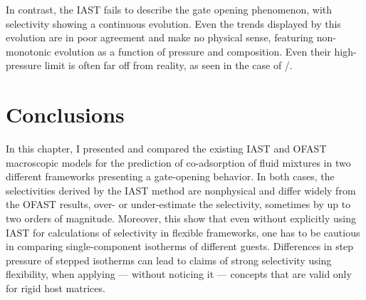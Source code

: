 \documentclass[thesis]{subfiles}
\begin{document}
In contrast, the IAST fails to describe the gate opening phenomenon, with
selectivity showing a continuous evolution. Even the trends displayed by this
evolution are in poor agreement and make no physical sense, featuring
non-monotonic evolution as a function of pressure and composition. Even their
high-pressure limit is often far off from reality, as seen in the case of
/.

\newpage
\section*{Conclusions}


In this chapter, I presented and compared the existing IAST and OFAST
macroscopic models for the prediction of co-adsorption of fluid mixtures in two
different frameworks presenting a gate-opening behavior. In both cases, the
selectivities derived by the IAST method are nonphysical and differ widely from
the OFAST results, over- or under-estimate the selectivity, sometimes by up to
two orders of magnitude. Moreover, this show that even without explicitly using
IAST for calculations of selectivity in flexible frameworks, one has to be
cautious in comparing single-component isotherms of different guests.
Differences in step pressure of stepped isotherms can lead to claims of strong
selectivity using flexibility, when applying --- without noticing it ---
concepts that are valid only for rigid host matrices.
\end{document}
